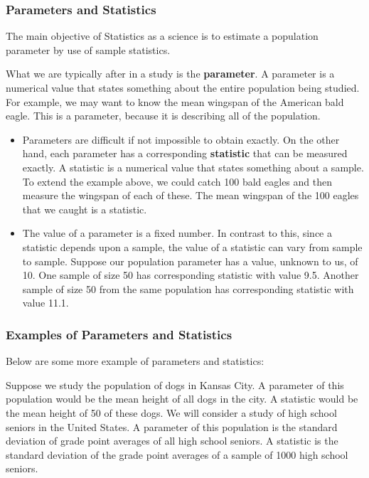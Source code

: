 ﻿\documentclass[]{report}
\begin{document}
\subsubsection*{Parameters and Statistics}

The main objective of Statistics as a science is to estimate a population parameter by use of sample statistics.

What we are typically after in a study is the \textbf{parameter}. A parameter is a numerical value that states something about the entire population being studied. For example, we may want to know the mean wingspan of the American bald eagle. This is a parameter, because it is describing all of the population.

\begin{itemize}
\item Parameters are difficult if not impossible to obtain exactly. On the other hand, each parameter has a corresponding \textbf{statistic} that can be measured exactly. A statistic is a numerical value that states something about a sample. To extend the example above, we could catch 100 bald eagles and then measure the wingspan of each of these. The mean wingspan of the 100 eagles that we caught is a statistic.

\item The value of a parameter is a fixed number. In contrast to this, since a statistic depends upon a sample, the value of a statistic can vary from sample to sample. Suppose our population parameter has a value, unknown to us, of 10. One sample of size 50 has corresponding statistic with value 9.5. Another sample of size 50 from the same population has corresponding statistic with value 11.1.
\end{itemize}


\subsubsection*{Examples of Parameters and Statistics}

Below are some more example of parameters and statistics:

Suppose we study the population of dogs in Kansas City. A parameter of this population would be the mean height of all dogs in the city. A statistic would be the mean height of 50 of these dogs.
We will consider a study of high school seniors in the United States. A parameter of this population is the standard deviation of grade point averages of all high school seniors. A statistic is the standard deviation of the grade point averages of a sample of 1000 high school seniors.
\end{document}
